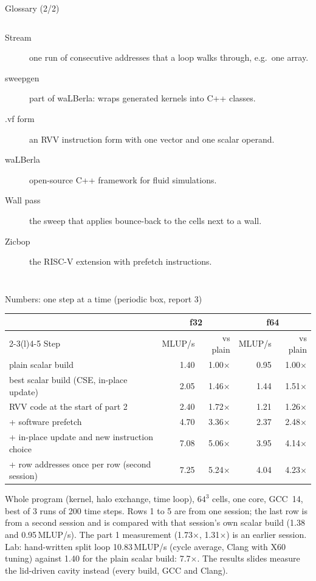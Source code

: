 \documentclass[aspectratio=169,10pt,t]{beamer}
\newcommand{\sx}[1]{#1\ensuremath{\times}} %
\begin{document}
\begin{frame}{Glossary (2/2)}
\begin{columns}[T,onlytextwidth]
\begin{description}
      \item[Stream] one run of consecutive addresses that a loop walks through, e.g.\ one array.
      \item[sweepgen] part of waLBerla: wraps generated kernels into C++ classes.
      \item[.vf form] an RVV instruction form with one vector and one scalar operand.
      \item[waLBerla] open-source C++ framework for fluid simulations.
      \item[Wall pass] the sweep that applies bounce-back to the cells next to a wall.
      \item[Zicbop] the RISC-V extension with prefetch instructions.
    \end{description}
  \end{columns}
\end{frame}

\begin{frame}{Numbers: one step at a time (periodic box, report 3)}
  \vspace{1mm}
  \centering
  {\small
  \begin{tabular}{@{}lrrrr@{}}
    \toprule
    & \multicolumn{2}{c}{\textbf{f32}} & \multicolumn{2}{c}{\textbf{f64}}\\
    \cmidrule(lr){2-3}\cmidrule(l){4-5}
    Step & MLUP/s & vs plain & MLUP/s & vs plain\\
    \midrule
    plain scalar build & 1.40 & \sx{1.00} & 0.95 & \sx{1.00}\\
    best scalar build (CSE, in-place update) & 2.05 & \sx{1.46} & 1.44 & \sx{1.51}\\
    RVV code at the start of part 2 & 2.40 & \sx{1.72} & 1.21 & \sx{1.26}\\
    + software prefetch & 4.70 & \sx{3.36} & 2.37 & \sx{2.48}\\
    + in-place update and new instruction choice & 7.08 & \sx{5.06} & 3.95 & \sx{4.14}\\
    + row addresses once per row (second session) & 7.25 & \sx{5.24} & 4.04 & \sx{4.23}\\
    \bottomrule
  \end{tabular}\par}

  \vspace{3mm}
  \raggedright
  {\scriptsize\color{psgray}
  Whole program (kernel, halo exchange, time loop), $64^3$ cells, one core, GCC~14, best of 3
  runs of 200 time steps. Rows 1 to 5 are from one session; the last row is from a second
  session and is compared with that session's own scalar build (1.38 and 0.95\,MLUP/s). The
  part 1 measurement (\sx{1.73}, \sx{1.31}) is an earlier session. Lab: hand-written split loop
  10.83\,MLUP/s (cycle average, Clang with X60 tuning) against 1.40 for the plain scalar build:
  \sx{7.7}. The results slides measure the lid-driven cavity instead (every build, GCC and Clang).\par}
\end{frame}
\end{document}
